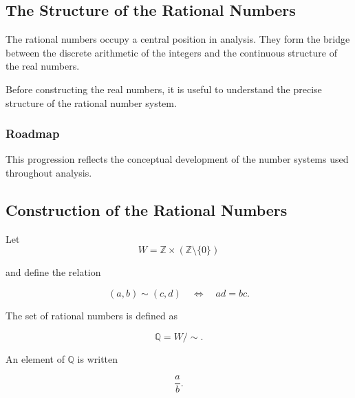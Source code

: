 
\subsection{The Structure of the Rational Numbers}

The rational numbers occupy a central position in analysis.
They form the bridge between the discrete arithmetic of the integers
and the continuous structure of the real numbers.

Before constructing the real numbers, it is useful to understand
the precise structure of the rational number system.

\subsubsection*{Roadmap}

\begin{center}
\end{center}

This progression reflects the conceptual development of the number
systems used throughout analysis.

\subsection{Construction of the Rational Numbers}

\begin{definition}
Let
\[
W = \mathbb{Z} \times (\mathbb{Z}\setminus\{0\})
\]

and define the relation

\[
(a,b) \sim (c,d) \quad \Longleftrightarrow \quad ad = bc .
\]

The set of rational numbers is defined as

\[
\mathbb{Q} = W / \sim .
\]

An element of $\mathbb{Q}$ is written

\[
\frac{a}{b}.
\]
\end{definition}


